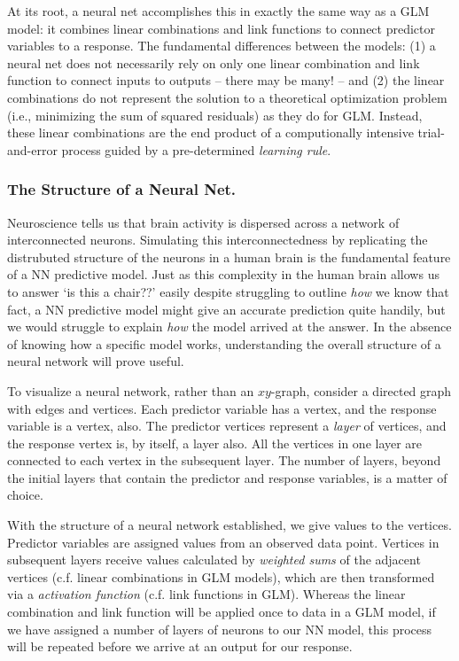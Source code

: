 \documentclass[12pt]{article}
\begin{document}
At its root, a neural net accomplishes this in exactly the same way as a GLM model: it combines linear combinations and link functions to connect predictor 
variables to a response.  The fundamental differences between the models: (1) a neural net does not necessarily rely on only one linear combination 
and link function to connect inputs to outputs -- there may be many! -- and (2) the linear combinations do not represent the solution to a 
theoretical optimization problem (i.e., minimizing the sum of squared residuals) as they do for GLM.  Instead, these linear combinations are the end product of a 
computionally intensive trial-and-error process guided by a pre-determined \textit{learning rule}.

\subsubsection{The Structure of a Neural Net.}
Neuroscience tells us that brain activity is dispersed across a network of interconnected neurons.  Simulating this interconnectedness by replicating
the distrubuted structure of the neurons in a human brain is the fundamental feature of a NN predictive model.  Just as this complexity in the
human brain allows us to answer `is this a chair??' easily despite struggling to outline \textit{how} we know that fact, a NN predictive model might
give an accurate prediction quite handily, but we would struggle to explain \textit{how} the model arrived at the answer.  In the absence of 
knowing how a specific model works, understanding the overall structure of a neural network will prove useful.

To visualize a neural network, rather than an $xy$-graph, consider a directed graph with edges and vertices.  Each predictor variable has a vertex,
and the response variable is a vertex, also.  The predictor vertices represent a \textit{layer} of vertices, and the response vertex is, by itself,
a layer also.  All the vertices in one layer are connected to each vertex in the subsequent layer.  The number of layers, beyond the initial layers that contain the predictor and response variables, is a matter of choice.


With the structure of a neural network established, we give values to the vertices.  Predictor variables are assigned values from an observed data
point.  Vertices in subsequent layers receive values calculated by \textit{weighted sums} of the adjacent vertices (c.f. linear combinations in GLM
models), which are then transformed via a \textit{activation function} (c.f. link functions in GLM).  Whereas the linear combination and link
function will be applied once to data in a GLM model, if we have assigned a number of layers of neurons to our NN model, this process will be
repeated before we arrive at an output for our response.  
\end{document}
